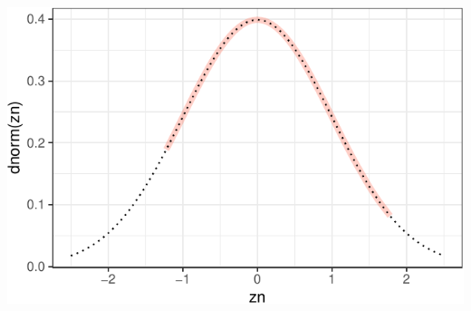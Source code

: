 \documentclass[]{article}
\begin{document}
\begin{center}\includegraphics{exercises_files/figure-latex/unnamed-chunk-10-1} \end{center}
\end{document}

